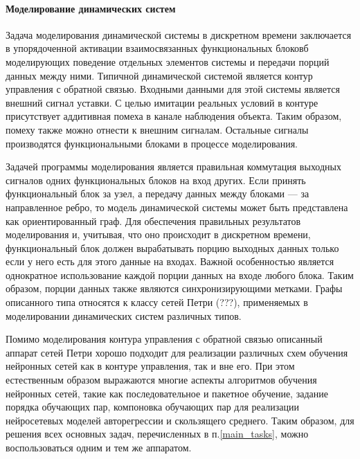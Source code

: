 \paragraph{Моделирование динамических систем}

Задача моделирования динамической системы в дискретном времени
заключается в упорядоченной активации взаимосвязанных функциональных
блоковб моделирующих поведение отдельных элементов системы и передачи
порций данных между ними.  Типичной динамической системой является
контур управления с обратной связью.  Входными данными для этой
системы является внешний сигнал уставки.  С целью имитации реальных
условий в контуре присутствует аддитивная помеха в канале наблюдения
объекта.  Таким образом, помеху также можно отнести к внешним
сигналам.  Остальные сигналы производятся функциональными блоками в
процессе моделирования.

Задачей программы моделирования является правильная коммутация
выходных сигналов одних функциональных блоков на вход других.  Если
принять функциональный блок за узел, а передачу данных между блоками
--- за направленное ребро, то модель динамической системы может быть
представлена как ориентированный граф.  Для обеспечения правильных
результатов моделирования и, учитывая, что оно происходит в дискретном
времени, функциональный блок должен вырабатывать порцию выходных
данных только если у него есть для этого данные на входах.  Важной
особенностью является однократное использование каждой порции данных
на входе любого блока.  Таким образом, порции данных также являются
синхронизирующими метками.  Графы описанного типа относятся к классу
сетей Петри (???), применяемых в моделировании динамических систем
различных типов.

Помимо моделирования контура управления с обратной связью описанный
аппарат сетей Петри хорошо подходит для реализации различных схем
обучения нейронных сетей как в контуре управления, так и вне его.  При
этом естественным образом выражаются многие аспекты алгоритмов
обучения нейронных сетей, такие как последовательное и пакетное
обучение, задание порядка обучающих пар, компоновка обучающих пар для
реализации нейросетевых моделей авторегрессии и скользящего среднего.
Таким образом, для решения всех основных задач, перечисленных в
п.\ref{main_tasks}, можно воспользоваться одним и тем же аппаратом.

